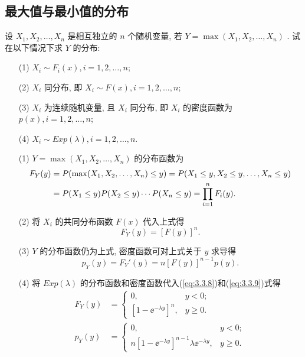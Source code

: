   \subsection{最大值与最小值的分布}\label{ssec:3.3.2}
   \begin{example}[最大值分布]\label{exam:3.3.4}
   	设 $X_1,X_2,\ldots,X_n$ 是相互独立的 $n$ 个随机变量, 若 $Y=\max(X_1,X_2,\ldots,X_n)$ . 试在以下情况下求 $Y$ 的分布:
   	\begin{itemize}
   		\item[(1)] $X_i\sim F_i(x),i=1,2,\ldots,n$;
   		\item[(2)] $X_i$ 同分布, 即 $X_i\sim F(x),i=1,2,\ldots,n$;
   		\item[(3)] $X_i$ 为连续随机变量, 且 $X_i$ 同分布, 即 $X_i$ 的密度函数为 $p(x),i=1,2,\ldots,n$;
   		\item[(4)] $X_i\sim Exp(\lambda),i=1,2,\ldots,n$.
   	\end{itemize}
   	\begin{solution}
   		\begin{itemize}
   			\item[(1)] $Y=\max(X_1,X_2,\ldots,X_n)$ 的分布函数为
   			\begin{align}
   				F_Y(y)
   				&=P(\max(X_1,X_2,\ldots,X_n)\leqslant y)=P(X_1\leqslant y,X_2\leqslant y,\ldots,X_n\leqslant y)\notag\\
   				&=P(X_1\leqslant y)P(X_2\leqslant y)\cdots P(X_n\leqslant y)=\prod_{i=1}^{n}F_i(y).\label{eq:3.3.7}
   			\end{align}
   			\item[(2)] 将 $X_i$ 的共同分布函数 $F(x)$ 代入上式得
   			\begin{equation}
   				F_Y(y)=[F(y)]^n.\label{eq:3.3.8}
   			\end{equation}
   			\item[(3)] $Y$ 的分布函数仍为上式, 密度函数可对上式关于 $y$ 求导得
   			\begin{equation}
   				p_Y(y)=F_{Y}'(y)=n[F(y)]^{n-1}p(y).\label{eq:3.3.9}
   			\end{equation}
   			\item[(4)] 将 $Exp(\lambda)$ 的分布函数和密度函数代入(\ref{eq:3.3.8})和(\ref{eq:3.3.9})式得
   			\begin{align*}
   				F_Y(y) &= \begin{cases}
   					0, & y<0;\\
   					[1-\ee^{-\lambda y}]^n, & y\geqslant0.
   				\end{cases}\\
   				p_Y(y) &= \begin{cases}
   					0, & y<0;\\
   					n[1-\ee^{-\lambda y}]^{n-1}\lambda\ee^{-\lambda y}, & y\geqslant0.
   				\end{cases}
   			\end{align*}
   		\end{itemize}
   	\end{solution}
   \end{example}
